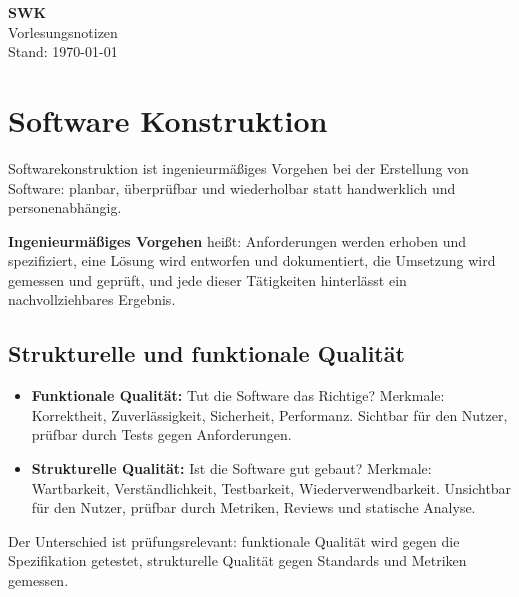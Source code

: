 \documentclass[12pt, a4paper]{article}
\begin{document}
\begin{center}
  {\LARGE\bfseries SWK}\\[6pt]
  {\large Vorlesungsnotizen}\\[4pt]
  {\small Stand: \today}
\end{center}

\vspace{1em}
\tableofcontents
\newpage


\section{Software Konstruktion}

Softwarekonstruktion ist ingenieurmäßiges Vorgehen bei der Erstellung von Software:
planbar, überprüfbar und wiederholbar statt handwerklich und personenabhängig.

\begin{definitionbox}
\textbf{Ingenieurmäßiges Vorgehen} heißt: Anforderungen werden erhoben und
spezifiziert, eine Lösung wird entworfen und dokumentiert, die Umsetzung wird
gemessen und geprüft, und jede dieser Tätigkeiten hinterlässt ein nachvollziehbares
Ergebnis.
\end{definitionbox}

\subsection{Strukturelle und funktionale Qualität}

\begin{itemize}
  \item \textbf{Funktionale Qualität:} Tut die Software das Richtige?
        Merkmale: Korrektheit, Zuverlässigkeit, Sicherheit, Performanz.
        Sichtbar für den Nutzer, prüfbar durch Tests gegen Anforderungen.
  \item \textbf{Strukturelle Qualität:} Ist die Software gut gebaut?
        Merkmale: Wartbarkeit, Verständlichkeit, Testbarkeit, Wiederverwendbarkeit.
        Unsichtbar für den Nutzer, prüfbar durch Metriken, Reviews und statische
        Analyse.
\end{itemize}

Der Unterschied ist prüfungsrelevant: funktionale Qualität wird gegen die
Spezifikation getestet, strukturelle Qualität gegen Standards und Metriken gemessen.
\end{document}
